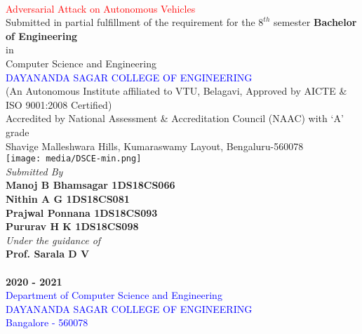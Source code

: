\documentclass[ 12pt,a4paper,twocolumn,fleqn]{article}
\begin{document}
\chead{}
\onecolumn
\begin{center}
 \\
\smallskip
\textcolor{red}{\LARGE{Adversarial Attack on Autonomous Vehicles}} \\
\large{Submitted in partial fulfillment of the requirement for the $8^{th}$ semester}
\large{\textbf{Bachelor of Engineering}} \\
\large{in} \\
\large{Computer Science and Engineering} \\
\textcolor{blue}{\LARGE{DAYANANDA SAGAR COLLEGE OF ENGINEERING}} \\
\footnotesize{(An Autonomous Institute affiliated to VTU, Belagavi, Approved by AICTE \& ISO 9001:2008 Certified)} \\
\footnotesize{Accredited by National Assessment \& Accreditation Council (NAAC) with ‘A’ grade}  \\
\footnotesize{Shavige Malleshwara Hills, Kumaraswamy Layout, Bengaluru-560078} \\
\texttt{[image: media/DSCE-min.png]} \\
\textit{Submitted By} \\
\textbf{Manoj B Bhamsagar \space 1DS18CS066} \\
\textbf{Nithin A G \space 1DS18CS081} \\
\textbf{Prajwal Ponnana \space 1DS18CS093} \\
\textbf{Pururav H K \space 1DS18CS098} \\
\textit{Under the guidance of} \\
\textbf{Prof. Sarala D V}\\
\\
\Large{\textbf{2020 - 2021}} \\
\textcolor{blue}{\Large{Department of Computer Science and Engineering}} \\
\textcolor{blue}{\Large{DAYANANDA SAGAR COLLEGE OF ENGINEERING}} \\
\textcolor{blue}{\Large{Bangalore - 560078}} \\
\end{center}
\newpage
  \pagestyle{fancy}
\thisfancypage{%
  \setlength{\fboxsep}{20pt}\doublebox}{}
\end{document}
